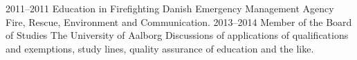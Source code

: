 \documentclass[]{friggeri-cv}
\begin{document}
\begin{entrylist}
  \entry
    {2011--2011}
    {Education in Firefighting}
    {Danish Emergency Management Agency}
    {Fire, Rescue, Environment and Communication.}
  \entry
    {2013--2014}
    {Member of the Board of Studies}
    {The University of Aalborg}
    {Discussions of applications of qualifications and exemptions, study lines, quality assurance of education and the like.}
\end{entrylist}
\end{document}
